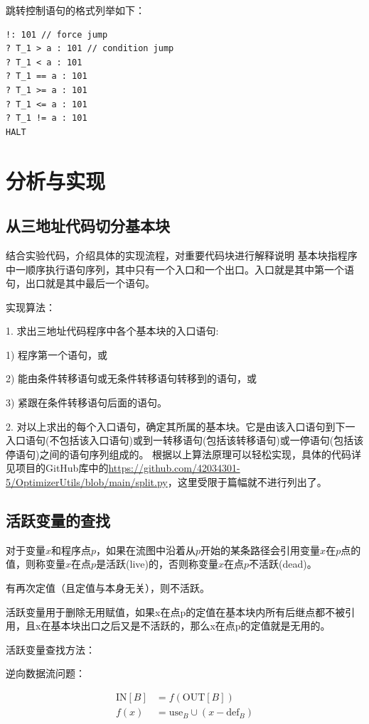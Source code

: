 \documentclass[cn,black,11pt,normal]{elegantnote}
\begin{document}
跳转控制语句的格式列举如下：
\begin{lstlisting}
!: 101 // force jump
? T_1 > a : 101 // condition jump
? T_1 < a : 101 
? T_1 == a : 101 
? T_1 >= a : 101 
? T_1 <= a : 101 
? T_1 != a : 101 
HALT
\end{lstlisting}


\section{分析与实现}

\subsection{从三地址代码切分基本块}

结合实验代码，介绍具体的实现流程，对重要代码块进行解释说明
基本块指程序中一顺序执行语句序列，其中只有一个入口和一个出口。入口就是其中第一个语句，出口就是其中最后一个语句。

实现算法：

1. 求出三地址代码程序中各个基本块的入口语句:

1) 程序第一个语句，或

2) 能由条件转移语句或无条件转移语句转移到的语句，或

3) 紧跟在条件转移语句后面的语句。

2. 对以上求出的每个入口语句，确定其所属的基本块。它是由该入口语句到下一入口语句(不包括该入口语句)或到一转移语句(包括该转移语句)或一停语句(包括该停语句)之间的语句序列组成的。
根据以上算法原理可以轻松实现，具体的代码详见项目的GitHub库中的\url{https://github.com/42034301-5/OptimizerUtils/blob/main/split.py}，这里受限于篇幅就不进行列出了。

\subsection{活跃变量的查找}

对于变量$x$和程序点$p$，如果在流图中沿着从$p$开始的某条路径会引用变量$x$在$p$点的值，则称变量$x$在点$p$是活跃(live)的，否则称变量$x$在点$p$不活跃(dead)。

有再次定值（且定值与本身无关），则不活跃。

活跃变量用于删除无用赋值，如果x在点p的定值在基本块内所有后继点都不被引用，且x在基本块出口之后又是不活跃的，那么x在点p的定值就是无用的。

活跃变量查找方法：

逆向数据流问题：

\begin{equation*}
    \begin{aligned}
        \text{IN}[B] &= f(\text{OUT}[B])\\
        f(x) &= \text{use}_B \cup (x - \text{def}_B)
    \end{aligned}
\end{equation*}
\end{document}
